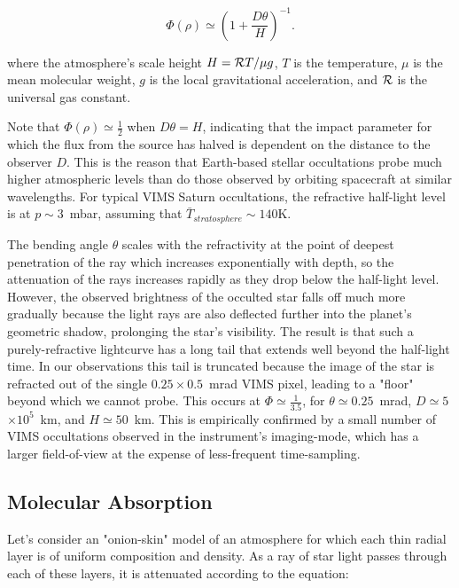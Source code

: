 \documentclass[preprint]{aastex}
\newcommand{\tdex}[1]{$\times 10^{#1}$}  %
\newcommand{\beq}{\begin{equation}}
\newcommand{\eeq}{\end{equation}}
\begin{document}
\begin{multicols}{2}
\beq
 \Phi(\rho) \simeq \left( 1 + \frac{D\theta}{H} \right)^{-1}.
\label{eq:approx_flux}
\eeq

\noindent where the atmosphere's scale height $H = {\cal R}T/\mu g$, $T$ is the
temperature, $\mu$ is the mean molecular weight, $g$ is the local gravitational
acceleration, and ${\cal R}$ is the universal gas constant.

Note that $\Phi(\rho) \simeq \frac{1}{2}$ when $D\theta = H$, indicating that
the impact parameter for which the flux from the source has halved is dependent
on the distance to the observer $D$. This is the reason that Earth-based
stellar occultations probe much higher atmospheric levels than do those
observed by orbiting spacecraft at similar wavelengths. For typical VIMS
Saturn occultations, the refractive half-light level is at $p \sim 3$~mbar,
assuming that $\bar{T}_{stratosphere} \sim 140$K. 

The bending angle $\theta$ scales with the refractivity at the point of deepest
penetration of the ray which increases exponentially with depth, so the
attenuation of the rays increases rapidly as they drop below the half-light
level. However, the observed brightness of the occulted star falls off much
more gradually because the light rays are also deflected further into the
planet's geometric shadow, prolonging the star's visibility. The result is that
such a purely-refractive lightcurve has a long tail that extends well beyond
the half-light time. In our observations this tail is truncated because the
image of the star is refracted out of the single $0.25\times0.5$~mrad VIMS
pixel, leading to a "floor" beyond which we cannot probe. This occurs at
$\Phi\simeq\frac{1}{3.5}$, for $\theta\simeq0.25$~mrad, $D\simeq5$\tdex{5}~km,
and $H\simeq50$~km. This is empirically confirmed by a small number of VIMS
occultations observed in the instrument's imaging-mode, which has a larger
field-of-view at the expense of less-frequent time-sampling.

\vspace{-9mm}
\subsection{Molecular Absorption}
\vspace{-3mm}

Let's consider an "onion-skin" model of an atmosphere for which each thin
radial layer is of uniform composition and density. As a ray of star light
passes through each of these layers, it is attenuated according to the
equation:


\end{multicols}
\end{document}
